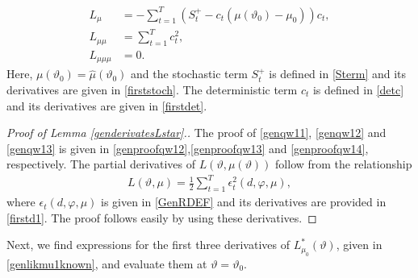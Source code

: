 {{\begin{lemma}
\begin{align*}
         L_{\mu} &= -\sum_{t = 1}^T \left(S_{t}^+ - c_{t}\left(\mu(\vartheta_0)-\mu_0\right)\right)  c_{t}, \\
            L_{\mu \mu}&= \sum_{t = 1}^T  c^2_{t}, \\
          L_{\mu \mu \mu}&= 0.    
\end{align*}
Here, $\mu(\vartheta_0) = \hat{\mu}(\vartheta_0)$ and the stochastic term $S_{t}^+$ is defined in \eqref{Sterm} and its derivatives are given in \eqref{firststoch}. The deterministic term $c_{t} $ is defined in \eqref{detc} and its derivatives are given in \eqref{firstdet}.
\end{lemma}
\begin{proof}[Proof of Lemma \ref{genderivatesLstar}.]
The proof of \eqref{genqw11}, \eqref{genqw12} and \eqref{genqw13} is given in \eqref{genproofqw12},\eqref{genproofqw13} and \eqref{genproofqw14}, respectively. The partial derivatives of  $L(\vartheta,\mu(\vartheta))$ follow from the relationship 
\begin{align*}
    L(\vartheta,\mu) = \frac{1}{2} \sum_{t = 1}^T\epsilon^2_t(d, \varphi, \mu),
\end{align*}
where $\epsilon_t(d, \varphi, \mu)$ is given in \eqref{GenRDEF} and its derivatives are provided in \eqref{firstd1}. The proof follows easily by using these derivatives.
\end{proof}



Next, we find expressions for the first three derivatives of $L_{\mu_0}^*(\vartheta)$, given in \eqref{genlikmu1known}, and evaluate them at $\vartheta = \vartheta_0$.  

}}
